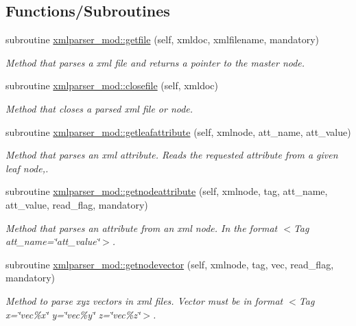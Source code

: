 \subsection*{Functions/\+Subroutines}
\begin{DoxyCompactItemize}
\item 
subroutine \mbox{\hyperlink{namespacexmlparser__mod_af7265285af04ac926f946c2989ed85b4}{xmlparser\+\_\+mod\+::getfile}} (self, xmldoc, xmlfilename, mandatory)
\begin{DoxyCompactList}\small\item\em Method that parses a xml file and returns a pointer to the master node. \end{DoxyCompactList}\item 
subroutine \mbox{\hyperlink{namespacexmlparser__mod_a9eed98475e0d55a3c7b2eeb88925a48c}{xmlparser\+\_\+mod\+::closefile}} (self, xmldoc)
\begin{DoxyCompactList}\small\item\em Method that closes a parsed xml file or node. \end{DoxyCompactList}\item 
subroutine \mbox{\hyperlink{namespacexmlparser__mod_a3e977c7792b08b009a09cc1f7fb4f80a}{xmlparser\+\_\+mod\+::getleafattribute}} (self, xmlnode, att\+\_\+name, att\+\_\+value)
\begin{DoxyCompactList}\small\item\em Method that parses an xml attribute. Reads the requested attribute from a given leaf node,. \end{DoxyCompactList}\item 
subroutine \mbox{\hyperlink{namespacexmlparser__mod_ade14a3d90326f84cfa52844aa4a16b75}{xmlparser\+\_\+mod\+::getnodeattribute}} (self, xmlnode, tag, att\+\_\+name, att\+\_\+value, read\+\_\+flag, mandatory)
\begin{DoxyCompactList}\small\item\em Method that parses an attribute from an xml node. In the format \textquotesingle{}$<$\+Tag att\+\_\+name=\char`\"{}att\+\_\+value\char`\"{}$>$\textquotesingle{}. \end{DoxyCompactList}\item 
subroutine \mbox{\hyperlink{namespacexmlparser__mod_a0c2ac0513cee4e660e07cb083a790a53}{xmlparser\+\_\+mod\+::getnodevector}} (self, xmlnode, tag, vec, read\+\_\+flag, mandatory)
\begin{DoxyCompactList}\small\item\em Method to parse xyz vectors in xml files. Vector must be in format \textquotesingle{}$<$\+Tag x=\char`\"{}vec\%x\char`\"{} y=\char`\"{}vec\%y\char`\"{} z=\char`\"{}vec\%z\char`\"{}$>$\textquotesingle{}. \end{DoxyCompactList}\item 

\end{DoxyCompactItemize}
